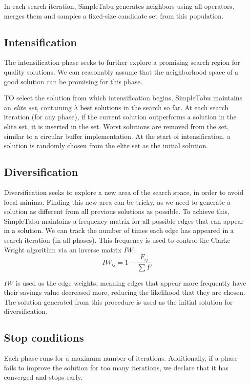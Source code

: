 \documentclass[12pt]{report}
\begin{document}
In each search iteration, SimpleTabu generates neighbors using all operators, merges them and samples a fixed-size candidate set from this population.

\subsection{Intensification}
The intensification phase seeks to further explore a promising search region for quality solutions. We can reasonably assume that the neighborhood space of a good solution can be promising for this phase.

TO select the solution from which intensification begins, SimpleTabu maintains an \textit{elite set}, containing $\lambda$ best solutions in the search so far. At each search iteration (for any phase), if the current solution outperforms a solution in the elite set, it is inserted in the set. Worst solutions are removed from the set, similar to a circular buffer implementation. At the start of intensification, a solution is randomly chosen from the elite set as the initial solution.

\subsection{Diversification}
Diversification seeks to explore a new area of the search space, in order to avoid local minima. Finding this new area can be tricky, as we need to generate a solution as different from all previous solutions as possible. To achieve this, SimpleTabu maintains a frequency matrix for all possible edges that can appear in a solution. We can track the number of times each edge has appeared in a search iteration (in all phases). This frequency is used to control the Clarke-Wright algorithm via an inverse matrix $IW$:
\[
	IW_{ij} = 1 - \frac{F_{ij}}{\sum F}
\]

$IW$ is used as the edge weights, meaning edges that appear more frequently have their savings value decreased more, reducing the likelihood that they are chosen. The solution generated from this procedure is used as the initial solution for diversification.

\subsection{Stop conditions}
Each phase runs for a maximum number of iterations. Additionally, if a phase fails to improve the solution for too many iterations, we declare that it has converged and stops early.
\end{document}

